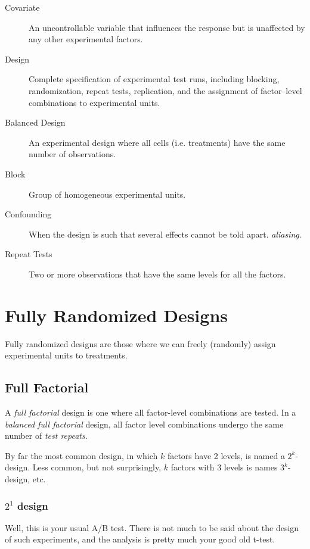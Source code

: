 \begin{description}
\item [Covariate]  An uncontrollable variable that influences the response but is
unaffected by any other experimental factors.

\item [Design]  Complete specification of experimental test runs, including blocking, randomization, repeat tests, replication, and the assignment of factor–level combinations to experimental units.

\item [Balanced Design] An experimental design where all cells (i.e. treatments) have the same number of observations.

\item [Block] Group of homogeneous experimental units.

\item [Confounding] When the design is such that several effects cannot be told apart. \Aka \emph{aliasing}.

\item [Repeat Tests] Two or more observations that have the same levels for all the factors.

\end{description}







\section{Fully Randomized Designs}
Fully randomized designs are those where we can freely (randomly) assign experimental units to treatments.


\subsection{Full Factorial}
A \emph{full factorial} design is one where all factor-level combinations are tested.
In a \emph{balanced full factorial} design, all factor level combinations undergo the same number of \emph{test repeats}.

By far the most common design, in which $k$ factors have 2 levels, is named a $2^k$-design.
Less common, but not surprisingly, $k$ factors with 3 levels is names $3^k$-design, etc.




\subsubsection{$2^1$ design}
Well, this is your usual A/B test. 
There is not much to be said about the design of such experiments, and the analysis is pretty much your good old t-test.




